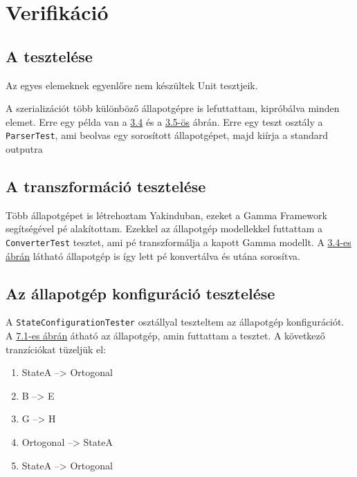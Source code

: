 \chapter{Verifikáció}
\label{sec:verifikacio}

\section{A {\thetaSc} tesztelése}
Az egyes elemeknek egyenlőre nem készültek Unit tesztjeik.

A szerializációt több különböző állapotgépre is lefuttattam, kipróbálva minden elemet. Erre egy példa van a \hyperref[fig:serializeexample]{3.4} és a \hyperref[fig:serializeresult]{3.5-ös} ábrán.
Erre egy teszt osztály a \verb+ParserTest+, ami beolvas egy sorosított állapotgépet, majd kiírja a standard outputra


\section{A transzformáció tesztelése}
Több állapotgépet is létrehoztam Yakinduban, ezeket a Gamma Framework segítségével {\gammaSc}pé alakítottam. Ezekkel az állapotgép modellekkel futtattam a \verb+ConverterTest+ tesztet, ami {\thetaSc}pé transzformálja a kapott Gamma modellt. A \hyperref[fig:serializeexample]{3.4-es ábrán} látható állapotgép is így lett {\thetaSc}pé konvertálva és utána sorosítva.


\section{Az állapotgép konfiguráció tesztelése}
A \verb+StateConfigurationTester+ osztállyal teszteltem az állapotgép konfigurációt. A \hyperref[fig:configexample]{7.1-es ábrán} átható az állapotgép, amin futtattam a tesztet. A következő tranzíciókat tüzeljük el: 
\begin{enumerate}
	\item StateA --> Ortogonal
	\item B --> E
	\item G --> H
	\item Ortogonal --> StateA
	\item StateA --> Ortogonal
\end{enumerate}


